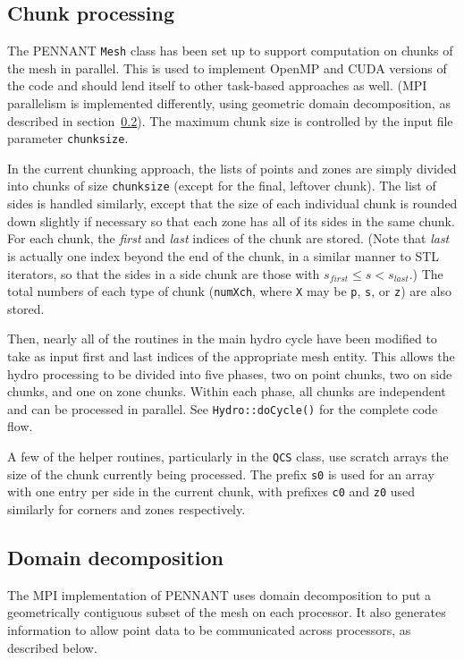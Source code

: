 \documentclass[11pt,letterpaper]{article}
\begin{document}
\subsection{Chunk processing}
\label{sec:chunk}

The PENNANT {\tt Mesh} class has been set up to support computation on
chunks of the mesh in parallel.  This is used to implement OpenMP and CUDA
versions of the code and should lend itself to other task-based approaches
as well.  (MPI parallelism is implemented differently, using geometric
domain decomposition, as described in section~\ref{sec:domain}).
The maximum chunk size is controlled by the input file parameter
{\tt chunksize}.

In the current chunking approach, the lists of points and zones are
simply divided into chunks of size {\tt chunksize} (except for the final,
leftover chunk).  The list of sides is handled similarly, except that
the size of each individual chunk is rounded down slightly if necessary
so that each zone has all of its sides in the same chunk.  For each chunk,
the {\em first} and {\em last} indices of the chunk are stored.
(Note that {\em last} is actually one index beyond the end of the chunk,
in a similar manner to STL iterators, so that the sides in a side chunk
are those with $s_{first} \le s < s_{last}$.)  The total numbers of each
type of chunk ({\tt numXch}, where {\tt X} may be {\tt p}, {\tt s}, or
{\tt z}) are also stored.

Then, nearly all of the routines in the main hydro cycle have been
modified to take as input first and last indices of the appropriate
mesh entity.  This allows the hydro processing to be divided into
five phases, two on point chunks, two on side chunks, and one on zone
chunks.  Within each phase, all chunks are independent and can be
processed in parallel.
See {\tt Hydro::doCycle()} for the complete code flow.

A few of the helper routines, particularly in the {\tt QCS} class,
use scratch arrays the size of the chunk currently being processed.
The prefix {\tt s0} is used for an array with one entry per side
in the current chunk, with prefixes {\tt c0} and {\tt z0} used similarly
for corners and zones respectively.

\subsection{Domain decomposition}
\label{sec:domain}

The MPI implementation of PENNANT uses domain decomposition to put
a geometrically contiguous subset of the mesh on each processor.
It also generates information to allow point data to be communicated
across processors, as described below.
\end{document}
